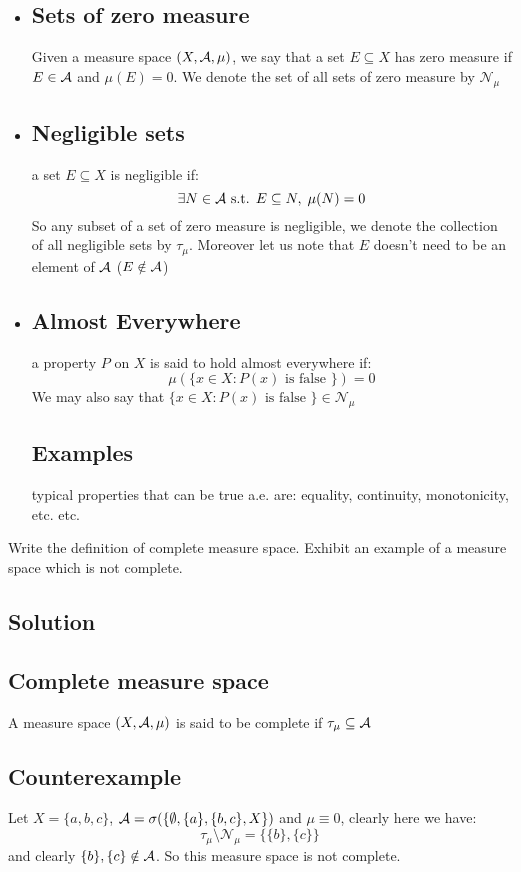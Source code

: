 \provdefs
\begin{itemize}
    \item \subsection{Sets of zero measure} 
    Given a measure space $(X,\mathcal{A},\mu)$, we say that a set $E\subseteq X$ has zero measure if $E\in\mathcal{A}$ and $\mu(E)=0$. We denote the set of all sets of zero measure by $\mathcal{N}_{\mu}$
    \item \subsection{Negligible sets} a set $E\subseteq X$ is negligible if:
    \[
        \exists N\in\mathcal{A} \text{ s.t. } E \subseteq N, \; \mu(N)=0
    \]
    So any subset of a set of zero measure is negligible, we denote the collection of all negligible sets by $\tau_{\mu}$. Moreover let us note that $E$ doesn't need to be an element of $\mathcal{A}$ ($E\notin\mathcal{A}$)
    \item \subsection{Almost Everywhere} a property $P$ on $X$ is said to hold almost everywhere if:
    \[
       \mu( \{ x\in X: P(x) \text{ is false } \} ) = 0    
    \]
    We may also say that $\{ x\in X: P(x) \text{ is false } \} \in \mathcal{N}_{\mu}$\\
    \subsection*{Examples} typical properties that can be true a.e. are: equality, continuity, monotonicity, etc. etc.
\end{itemize}


\question
Write the definition of complete measure space. Exhibit an example of a measure space which
is not complete.

\subsection*{Solution}
\subsection{Complete measure space}
A measure space $(X,\mathcal{A},\mu)$ is said to be complete if $\tau_{\mu}\subseteq\mathcal{A}$
\subsection*{Counterexample}
Let $X=\{a,b,c\}$, $\mathcal{A} = \sigma (\{\emptyset, \{a\}, \{b,c\}, X \})$ and $\mu\equiv 0$, clearly here we have:
\[
    \tau_{\mu} \setminus \mathcal{N}_{\mu}= \{ \{b\}, \{c\} \}    
\]
and clearly $\{b\}, \{c\} \notin \mathcal{A}$. So this measure space is not complete.


